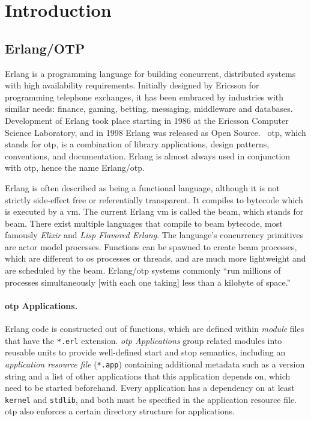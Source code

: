 \section{Introduction}

\subsection{Erlang/OTP}

Erlang is a programming language for building concurrent, distributed systems with high availability requirements. Initially designed by Ericsson for programming telephone exchanges, it has been embraced by industries with similar needs: finance, gaming, betting, messaging, middleware and databases. Development of Erlang took place starting in 1986 at the Ericsson Computer Science Laboratory, and in 1998 Erlang was released as Open Source.~\cite{armstrong2007history} \acrshort{otp}, which stands for \acrlong{otp}, is a combination of library applications, design patterns, conventions, and documentation. Erlang is almost always used in conjunction with \acrshort{otp}, hence the name Erlang/\acrshort{otp}.~\cite{ferd}

Erlang is often described as being a functional language, although it is not strictly side-effect free or referentially transparent. It compiles to bytecode which is executed by a \acrfull{vm}. The current Erlang \acrshort{vm} is called the \acrshort{beam}, which stands for \acrlong{beam}. There exist multiple languages that compile to \acrshort{beam} bytecode, most famously \emph{Elixir} and \emph{Lisp Flavored Erlang}. The language's concurrency primitives are actor model processes. Functions can be spawned to create \acrshort{beam} processes, which are different to \acrshort{os} processes or threads, and are much more lightweight and are scheduled by the \acrshort{beam}. Erlang/\acrshort{otp} systems commonly ``run millions of processes simultaneously [with each one taking] less than a kilobyte of space.''~\cite{larson}

\paragraph{\acrshort{otp} Applications.}
Erlang code is constructed out of functions, which are defined within \emph{module} files that have the \lstinline|*.erl| extension. \emph{\acrshort{otp} Applications} group related modules into reusable units to provide well-defined start and stop semantics, including an \emph{application resource file} (\lstinline|*.app|) containing additional metadata such as a version string and a list of other applications that this application depends on, which need to be started beforehand. Every application has a dependency on at least \lstinline|kernel| and \lstinline|stdlib|, and both must be specified in the application resource file.~\cite{doc:otp} \acrshort{otp} also enforces a certain directory structure for applications.~\cite{logan:otp}

